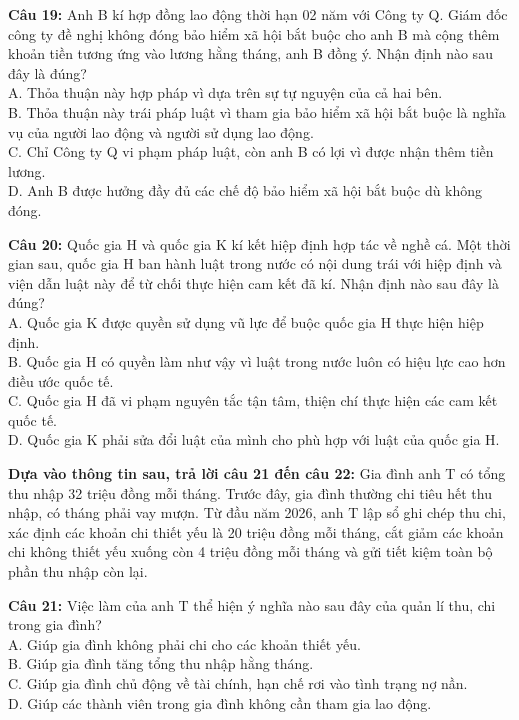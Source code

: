 \documentclass[12pt,a4paper]{article}
\begin{document}
\noindent \textbf{Câu 19:} Anh B kí hợp đồng lao động thời hạn 02 năm với Công ty Q. Giám đốc công ty đề nghị không đóng bảo hiểm xã hội bắt buộc cho anh B mà cộng thêm khoản tiền tương ứng vào lương hằng tháng, anh B đồng ý. Nhận định nào sau đây là đúng?\\
\noindent A. Thỏa thuận này hợp pháp vì dựa trên sự tự nguyện của cả hai bên.\\
\noindent B. Thỏa thuận này trái pháp luật vì tham gia bảo hiểm xã hội bắt buộc là nghĩa vụ của người lao động và người sử dụng lao động.\\
\noindent C. Chỉ Công ty Q vi phạm pháp luật, còn anh B có lợi vì được nhận thêm tiền lương.\\
\noindent D. Anh B được hưởng đầy đủ các chế độ bảo hiểm xã hội bắt buộc dù không đóng.

\noindent \textbf{Câu 20:} Quốc gia H và quốc gia K kí kết hiệp định hợp tác về nghề cá. Một thời gian sau, quốc gia H ban hành luật trong nước có nội dung trái với hiệp định và viện dẫn luật này để từ chối thực hiện cam kết đã kí. Nhận định nào sau đây là đúng?\\
\noindent A. Quốc gia K được quyền sử dụng vũ lực để buộc quốc gia H thực hiện hiệp định.\\
\noindent B. Quốc gia H có quyền làm như vậy vì luật trong nước luôn có hiệu lực cao hơn điều ước quốc tế.\\
\noindent C. Quốc gia H đã vi phạm nguyên tắc tận tâm, thiện chí thực hiện các cam kết quốc tế.\\
\noindent D. Quốc gia K phải sửa đổi luật của mình cho phù hợp với luật của quốc gia H.

\noindent \textbf{Dựa vào thông tin sau, trả lời câu 21 đến câu 22:} Gia đình anh T có tổng thu nhập 32 triệu đồng mỗi tháng. Trước đây, gia đình thường chi tiêu hết thu nhập, có tháng phải vay mượn. Từ đầu năm 2026, anh T lập sổ ghi chép thu chi, xác định các khoản chi thiết yếu là 20 triệu đồng mỗi tháng, cắt giảm các khoản chi không thiết yếu xuống còn 4 triệu đồng mỗi tháng và gửi tiết kiệm toàn bộ phần thu nhập còn lại.

\noindent \textbf{Câu 21:} Việc làm của anh T thể hiện ý nghĩa nào sau đây của quản lí thu, chi trong gia đình?\\
\noindent A. Giúp gia đình không phải chi cho các khoản thiết yếu.\\
\noindent B. Giúp gia đình tăng tổng thu nhập hằng tháng.\\
\noindent C. Giúp gia đình chủ động về tài chính, hạn chế rơi vào tình trạng nợ nần.\\
\noindent D. Giúp các thành viên trong gia đình không cần tham gia lao động.
\end{document}
